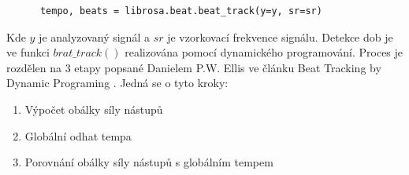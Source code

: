     \begin{lstlisting}
      tempo, beats = librosa.beat.beat_track(y=y, sr=sr)
    \end{lstlisting}
    
    Kde $ y $ je analyzovaný signál a $ sr $ je vzorkovací frekvence signálu.
    Detekce dob je ve funkci $ brat\_track() $ realizována pomocí dynamického programování. Proces je rozdělen na 3 etapy popsané Danielem P.W. Ellis ve článku Beat Tracking by Dynamic Programing \cite{Beat_tracking_by_dynamic_programing}. Jedná se o tyto kroky:

    \smallskip

    \begin{enumerate}
      \item Výpočet obálky síly nástupů
      \item Globální odhat tempa
      \item Porovnání obálky síly nástupů s globálním tempem
    \end{enumerate}

    \smallskip


